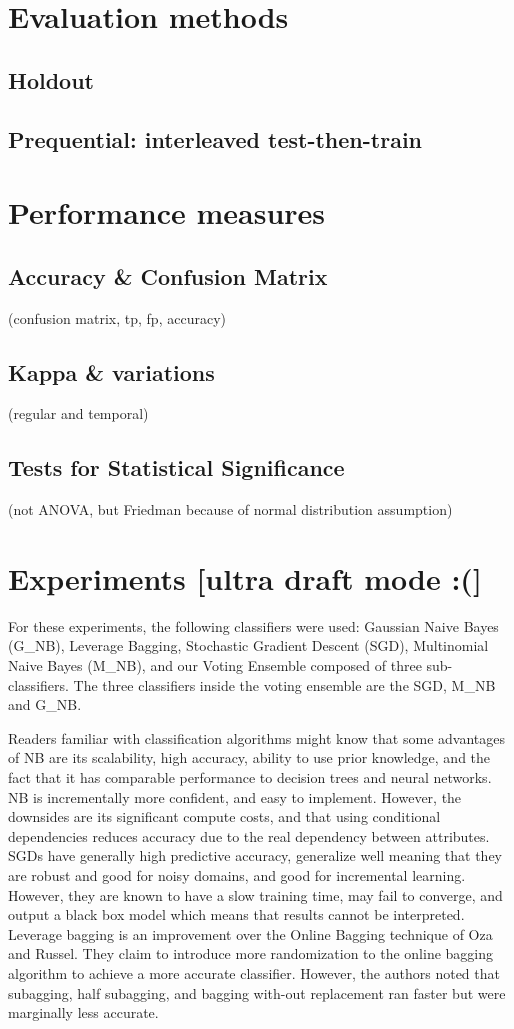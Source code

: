 \section{Evaluation methods}
\subsection{Holdout}
\subsection{Prequential: interleaved test-then-train}

\section{Performance measures}
\subsection{Accuracy \& Confusion Matrix}
(confusion matrix, tp, fp, accuracy)
\subsection{Kappa \& variations}
(regular and temporal)
\subsection{Tests for Statistical Significance}
(not ANOVA, but Friedman because of normal distribution assumption)

\section{Experiments [ultra draft mode :(]}
For these experiments, the following classifiers were used: Gaussian Naive Bayes (G\_NB), Leverage Bagging, Stochastic Gradient Descent (SGD), Multinomial Naive Bayes (M\_NB), and our Voting Ensemble composed of three sub-classifiers. The three classifiers inside the voting ensemble are the SGD, M\_NB and G\_NB.

Readers familiar with classification algorithms might know that some advantages of NB are its scalability, high accuracy, ability to use prior knowledge, and the fact that it has comparable performance to decision trees and neural networks. NB is incrementally more confident, and easy to implement. However, the downsides are its significant compute costs, and that using conditional dependencies reduces accuracy due to the real dependency between attributes.
SGDs have generally high predictive accuracy, generalize well meaning that they are robust and good for noisy domains, and good for incremental learning. However, they are known to have a slow training time, may fail to converge, and output a black box model which means that results cannot be interpreted.
Leverage bagging \cite{bifet2010leveraging} is an improvement over the Online Bagging technique of Oza and Russel. They claim to introduce more randomization to the online bagging algorithm to achieve a more accurate classifier. However, the authors noted that subagging, half subagging, and bagging with-out replacement ran faster but were marginally less accurate.

